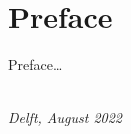 \chapter*{Preface}

Preface\ldots

\begin{flushright}
{\makeatletter\itshape
    \@author \\
    Delft, August 2022
\makeatother}
\end{flushright}

